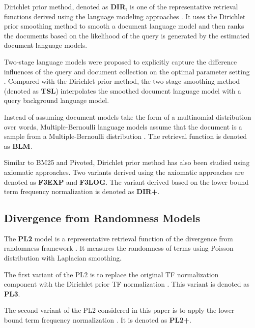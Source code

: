 Dirichlet prior method, denoted as \textbf{DIR}, is one of the 
representative retrieval functions derived using the language 
modeling approaches \cite{Zhai:2004:SSM:984321.984322}.  It 
uses the Dirichlet prior smoothing method to smooth a document 
language model and then ranks the documents based on the 
likelihood of the query is generated by the estimated document 
language models. 

Two-stage language models were proposed to explicitly capture 
the difference influences of the query and document collection
on the optimal parameter setting \cite{Zhai:2002:TLM:564376.564387}. 
Compared with the Dirichlet prior method, the two-stage smoothing 
method (denoted as \textbf{TSL}) interpolates the smoothed document 
language model with a query background language model. 

Instead of assuming document models take the form of a multinomial 
distribution over words, Multiple-Bernoulli language models
assume that the document is a sample from a Multiple-Bernoulli 
distribution \cite{Metzler:2004:FMM:1008992.1009110}. 
The retrieval function is denoted as \textbf{BLM}. 

Similar to BM25 and Pivoted, Dirichlet prior method has also been 
studied using axiomatic approaches. Two variants derived using 
the axiomatic approaches \cite{Fang:2005:EAA:1076034.1076116} are 
denoted as \textbf{F3EXP} and \textbf{F3LOG}. The variant derived 
based on the lower bound term frequency normalization \cite{Lv:2011:LTF:2063576.2063584}
is denoted as \textbf{DIR+}. 

\subsection{Divergence from Randomness Models} 

The \textbf{PL2} model is a representative retrieval 
function of the divergence from randomness framework 
\cite{Amati:2002:PMI:582415.582416}. 
It measures the randomness of terms using 
Poisson distribution with Laplacian smoothing.

The first variant of the PL2 is to replace the original TF 
normalization component with the Dirichlet 
prior TF normalization \cite{He:2005:SDP:1076034.1076114}. 
This variant is denoted as \textbf{PL3}. 

The second variant of the PL2 considered in this paper is 
to apply the lower bound term frequency normalization 
\cite{Lv:2011:LTF:2063576.2063584}.  It is denoted as 
\textbf{PL2+}. 

